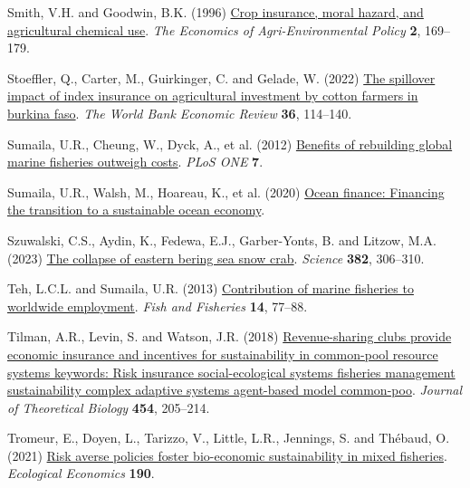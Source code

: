 \documentclass[
  letterpaper,
  DIV=11,
  numbers=noendperiod]{scrartcl}
\newlength{\cslhangindent}
\newlength{\cslentryspacingunit} %
\newenvironment{CSLReferences}[2] %
 {%
  \setlength{\parindent}{0pt}
  \ifodd #1
  \let\oldpar\par
  \def\par{\hangindent=\cslhangindent\oldpar}
  \fi
  \setlength{\parskip}{#2\cslentryspacingunit}
 }%
 {}
\theoremstyle{plain}
\theoremstyle{plain}
\theoremstyle{remark}
\begin{document}
\begin{CSLReferences}{1}{0}
\leavevmode{}%
Smith, V.H. and Goodwin, B.K. (1996)
\href{https://doi.org/10.2307/1243714}{Crop insurance, moral hazard, and
agricultural chemical use}. \emph{The Economics of Agri-Environmental
Policy} \textbf{2}, 169--179.

\leavevmode{}%
Stoeffler, Q., Carter, M., Guirkinger, C. and Gelade, W. (2022)
\href{https://doi.org/10.1093/wber}{The spillover impact of index
insurance on agricultural investment by cotton farmers in burkina faso}.
\emph{The World Bank Economic Review} \textbf{36}, 114--140.

\leavevmode{}%
Sumaila, U.R., Cheung, W., Dyck, A., et al. (2012)
\href{https://doi.org/10.1371/journal.pone.0040542}{Benefits of
rebuilding global marine fisheries outweigh costs}. \emph{PLoS ONE}
\textbf{7}.

\leavevmode{}%
Sumaila, U.R., Walsh, M., Hoareau, K., et al. (2020)
\href{https://www.oceanpanel.org/blue-}{Ocean finance: Financing the
transition to a sustainable ocean economy}.

\leavevmode{}%
Szuwalski, C.S., Aydin, K., Fedewa, E.J., Garber-Yonts, B. and Litzow,
M.A. (2023) \href{https://doi.org/10.1126/SCIENCE.ADF6035}{The collapse
of eastern bering sea snow crab}. \emph{Science} \textbf{382}, 306--310.

\leavevmode{}%
Teh, L.C.L. and Sumaila, U.R. (2013)
\href{https://doi.org/10.1111/j.1467-2979.2011.00450.x}{Contribution of
marine fisheries to worldwide employment}. \emph{Fish and Fisheries}
\textbf{14}, 77--88.

\leavevmode{}%
Tilman, A.R., Levin, S. and Watson, J.R. (2018)
\href{https://doi.org/10.1016/j.jtbi.2018.06.003}{Revenue-sharing clubs
provide economic insurance and incentives for sustainability in
common-pool resource systems keywords: Risk insurance social-ecological
systems fisheries management sustainability complex adaptive systems
agent-based model common-poo}. \emph{Journal of Theoretical Biology}
\textbf{454}, 205--214.

\leavevmode{}%
Tromeur, E., Doyen, L., Tarizzo, V., Little, L.R., Jennings, S. and
Thébaud, O. (2021)
\href{https://doi.org/10.1016/j.ecolecon.2021.107178}{Risk averse
policies foster bio-economic sustainability in mixed fisheries}.
\emph{Ecological Economics} \textbf{190}.


\end{CSLReferences}
\end{document}
